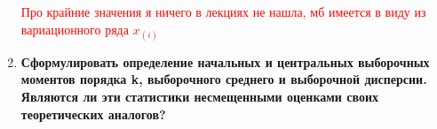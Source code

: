 \documentclass[12pt]{report}
\begin{document}
\begin{enumerate}
\begin{figure}[!h]
	\end{figure}
	\begin{figure}[!h]
	\end{figure}
	\textcolor{red}{Про крайние значения я ничего в лекциях не нашла, мб имеется в виду из вариационного ряда $x_{(i)}$}
	
	\item \textbf{Сформулировать определение начальных и центральных выборочных моментов порядка k,
		выборочного среднего и выборочной дисперсии. Являются ли эти статистики несмещенными
		оценками своих теоретических аналогов?}
	
	\begin{figure}[!h]
	\end{figure}


\end{enumerate}
\end{document}
